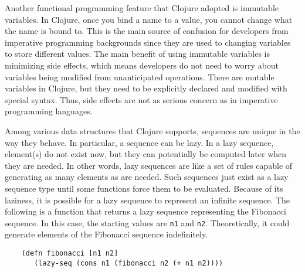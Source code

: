 \documentclass[12pt]{article}
\newcommand{\comment}[1]{{\bf \tt  {#1}}}
\newcommand{\emcomment}[1]{\textcolor{ForestGreen}{\comment{Elena: {#1}}}}
\newcommand{\tscomment}[1]{\textcolor{Teal}{\comment{Tony: {#1}}}}
\begin{document}
	Another functional programming feature that Clojure adopted is immutable variables. In Clojure, once you bind a 
	name to a value, you cannot change what the name is bound to.
	This is the main source of confusion for developers from imperative programming backgrounds since they are used to 
	changing variables to store different values.
	The main benefit of using immutable variables is minimizing side effects, which means 
	developers do not need to worry about variables being modified from unanticipated operations. 
	There are mutable variables in Clojure, but they need to be explicitly declared and modified with special syntax.
	Thus, side effects are not as serious concern as in imperative programming languages. 
	
	Among various data structures that Clojure supports, sequences are unique in 
	the way they behave. In particular, a sequence can be lazy. In a lazy sequence, element(s) do not exist now, but they 
	can potentially be computed later when they are needed. 
	In other words, lazy sequences are like a set of rules capable of generating as many elements as are needed.
	Such sequences just exist as a lazy sequence type until some functions force them to be evaluated. Because of its laziness, it is possible 
	for a lazy sequence to represent an infinite sequence. The following is a function that returns a lazy sequence representing the 
	Fibonacci sequence. In this case, the starting values are {\tt  n1} and {\tt n2}. Theoretically, it could generate elements of the Fibonacci 
	sequence indefinitely. 
	\begin{verbatim}
	(defn fibonacci [n1 n2]
	   (lazy-seq (cons n1 (fibonacci n2 (+ n1 n2))))
	\end{verbatim}
	
\end{document}
